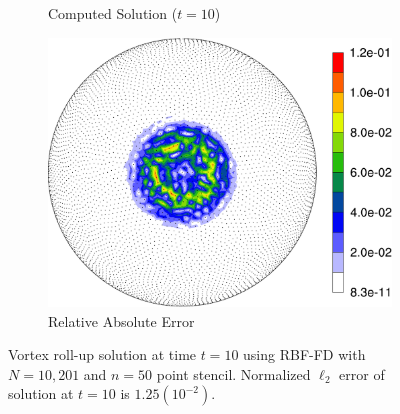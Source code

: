 \documentclass{report}
\begin{document}
\begin{figure}
\begin{center}
\begin{subfigure}[b]{0.49\textwidth}
	\caption{Computed Solution ($t=10$)}
	\label{fig:vortex_approx}
\end{subfigure} 
\begin{subfigure}[b]{0.49\textwidth}
	\centering
	\includegraphics[width=1.0\textwidth]{../figures/paper1/figures/vortex_rollup/vortexRelativeError-eps-converted-to.pdf}
	\caption{Relative Absolute Error}
	\label{fig:vortex_relerr}
\end{subfigure}
\caption{Vortex roll-up solution at time $t=10$ using RBF-FD with $N=10,201$ and $n=50$ point stencil. Normalized $\ell_2$ error of solution at $t=10$ is $1.25(10^{-2})$. }
\label{fig:vortex_t10}
\end{center}
\end{figure}
\end{document}

